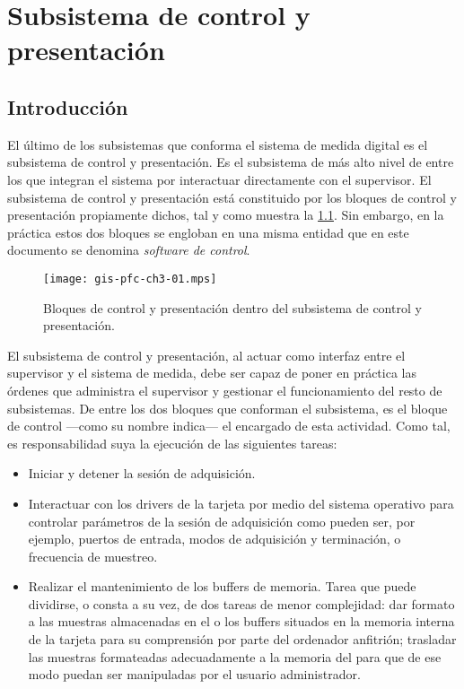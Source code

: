 \chapter{Subsistema de control y presentación}

\section{Introducción}

El último de los subsistemas que conforma el sistema de medida digital es
el subsistema de control y presentación. Es el subsistema de más alto nivel
de entre los que integran el sistema por interactuar directamente con el
supervisor. El subsistema de control y presentación está constituido por
los bloques de control y presentación propiamente dichos, tal y como
muestra la \cref{fig:subconpre}. Sin embargo, en la práctica estos dos
bloques se engloban en una misma entidad que en este documento se denomina
\emph{software de control}.

\begin{figure}
	\begin{center}
		\texttt{[image: gis-pfc-ch3-01.mps]}
	\end{center}
	\caption[Subsistema de control y presentación] {Bloques de control
	y presentación dentro del subsistema de control y presentación.}
	\label{fig:subconpre}
\end{figure}

El subsistema de control y presentación, al actuar como interfaz entre el
supervisor y el sistema de medida, debe ser capaz de poner en práctica las
órdenes que administra el supervisor y gestionar el funcionamiento del
resto de subsistemas. De entre los dos bloques que conforman el subsistema,
es el bloque de control ---como su nombre indica--- el encargado de esta
actividad. Como tal, es responsabilidad suya la ejecución de las siguientes
tareas:

\begin{itemize}
	\item Iniciar y detener la sesión de adquisición.
	\item Interactuar con los drivers de la tarjeta por medio del
		sistema operativo para controlar parámetros de la sesión de
		adquisición como pueden ser, por ejemplo, puertos de
		entrada, modos de adquisición y terminación, o frecuencia
		de muestreo.
	\item Realizar el mantenimiento de los buffers de memoria. Tarea
		que puede dividirse, o consta a su vez, de dos tareas de
		menor complejidad: dar formato a las muestras almacenadas
		en el o los buffers situados en la memoria interna de la
		tarjeta para su comprensión por parte del ordenador
		anfitrión; trasladar las muestras formateadas adecuadamente
		a la memoria del \pc{} para que de ese modo puedan ser
		manipuladas por el usuario administrador.
\end{itemize}

